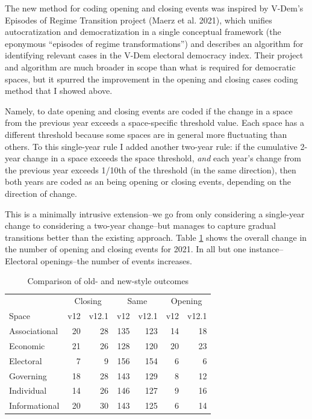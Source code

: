 \documentclass[
  11pt,
]{article}
\begin{document}
The new method for coding opening and closing events was inspired by
V-Dem's Episodes of Regime Transition project (Maerz et al. 2021), which
unifies autocratization and democratization in a single conceptual
framework (the eponymous ``episodes of regime transformations'') and
describes an algorithm for identifying relevant cases in the V-Dem
electoral democracy index. Their project and algorithm are much broader
in scope than what is required for democratic spaces, but it spurred the
improvement in the opening and closing cases coding method that I showed
above.

Namely, to date opening and closing events are coded if the change in a
space from the previous year exceeds a space-specific threshold value.
Each space has a different threshold because some spaces are in general
more fluctuating than others. To this single-year rule I added another
two-year rule: if the cumulative 2-year change in a space exceeds the
space threshold, \emph{and} each year's change from the previous year
exceeds 1/10th of the threshold (in the same direction), then both years
are coded as an being opening or closing events, depending on the
direction of change.

This is a minimally intrusive extension--we go from only considering a
single-year change to considering a two-year change--but manages to
capture gradual transitions better than the existing approach. Table
\ref{tab:outcome-comparison} shows the overall change in the number of
opening and closing events for 2021. In all but one instance--Electoral
openings--the number of events increases.

\begin{table}

\caption{\label{tab:outcome-comparison}Comparison of old- and new-style outcomes}
\centering
\begin{tabular}[t]{lrrrrrr}
\toprule
\multicolumn{1}{c}{} & \multicolumn{2}{c}{Closing} & \multicolumn{2}{c}{Same} & \multicolumn{2}{c}{Opening} \\
\cmidrule(l{3pt}r{3pt}){2-3} \cmidrule(l{3pt}r{3pt}){4-5} \cmidrule(l{3pt}r{3pt}){6-7}
Space & v12 & v12.1 & v12 & v12.1 & v12 & v12.1\\
\midrule
Associational & 20 & 28 & 135 & 123 & 14 & 18\\
Economic & 21 & 26 & 128 & 120 & 20 & 23\\
Electoral & 7 & 9 & 156 & 154 & 6 & 6\\
Governing & 18 & 28 & 143 & 129 & 8 & 12\\
Individual & 14 & 26 & 146 & 127 & 9 & 16\\
Informational & 20 & 30 & 143 & 125 & 6 & 14\\
\bottomrule
\end{tabular}
\end{table}
\end{document}
